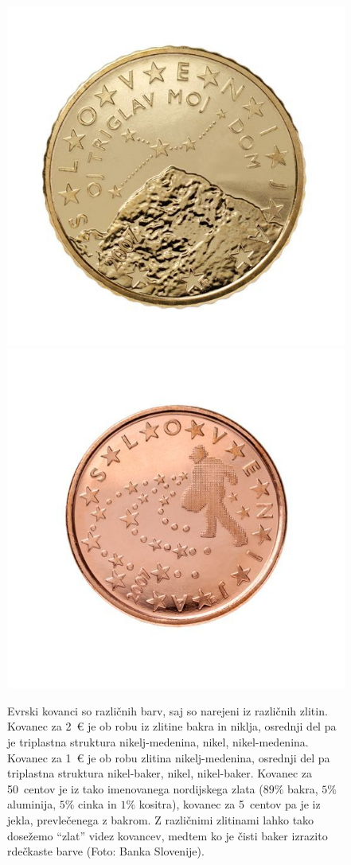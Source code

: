 \begin{figure}[h!]
\includegraphics[width=35truemm]{slike/09_50centov.jpg}
\includegraphics[width=35truemm]{slike/09_5centov.jpg}
\caption{Evrski kovanci so različnih barv, saj so narejeni iz različnih zlitin. Kovanec za 2~€ je 
ob robu iz zlitine bakra in niklja, osrednji del pa je triplastna struktura nikelj-medenina, nikel, nikel-medenina. Kovanec za 1~€ je ob robu zlitina nikelj-medenina, osrednji del pa triplastna struktura
nikel-baker, nikel, nikel-baker. Kovanec za 50~centov je iz tako imenovanega nordijskega 
zlata ($89\%$ bakra, $5\%$ aluminija, $5\%$ cinka in $1\%$ kositra), kovanec za 5~centov pa je iz jekla, prevlečenega z bakrom. Z različnimi zlitinami lahko tako dosežemo ``zlat'' videz kovancev, medtem ko
je čisti baker izrazito rdečkaste barve (Foto: Banka Slovenije).}
\label{fig:09_kovanci}
\end{figure}


